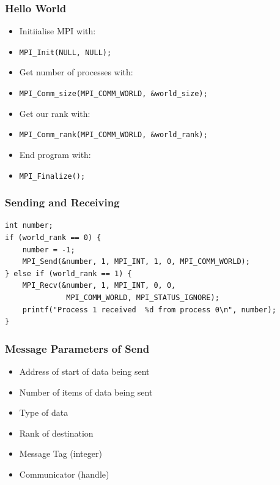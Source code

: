 \documentclass{beamer}
\begin{document}
          \begin{frame}
          	\frametitle{Hello World}
          	\begin{itemize}
          		\item Initiialise MPI with:
          		\item \texttt{MPI\_Init(NULL, NULL);}
          		\item Get number of processes with:
          		\item \texttt{MPI\_Comm\_size(MPI\_COMM\_WORLD, \&world\_size);}
          		\item Get our rank with:
          		\item \texttt{MPI\_Comm\_rank(MPI\_COMM\_WORLD, \&world\_rank);}
				\item End program with:
				\item  \texttt{MPI\_Finalize();}
          	\end{itemize}
        \end{frame}
        \begin{frame}[fragile=singleslide]
        	\frametitle{Sending and Receiving}  	
          	  \begin{verbatim}
int number;
if (world_rank == 0) {
    number = -1;
    MPI_Send(&number, 1, MPI_INT, 1, 0, MPI_COMM_WORLD);
} else if (world_rank == 1) {
    MPI_Recv(&number, 1, MPI_INT, 0, 0, 
              MPI_COMM_WORLD, MPI_STATUS_IGNORE); 
    printf("Process 1 received  %d from process 0\n", number); 	  
}
          	  \end{verbatim} 
         \end{frame}
         \begin{frame}
         	\frametitle{Message Parameters of Send}
         	\begin{itemize}
         		\item Address of start of data being sent
         		\item Number of items of data being sent 
         		\item Type of data
         		\item Rank of destination
         		\item Message Tag (integer)
         		\item Communicator (handle)
         	\end{itemize}
         
         \end{frame}   
\end{document}
